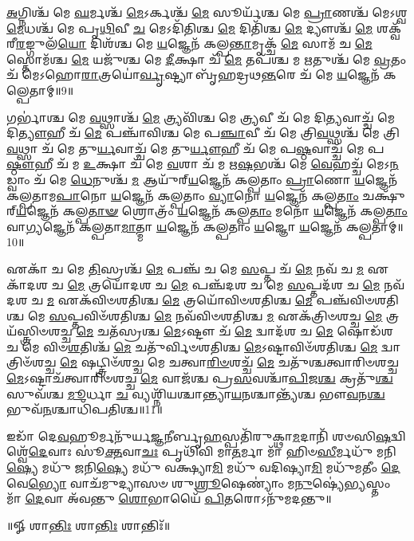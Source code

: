 \-\ul{𑌅}\-𑌗𑍍𑌨𑌿𑌶𑍍𑌚᳴ 𑌮𑍇 \ul{𑌘}\-𑌰𑍍𑌮𑌶𑍍𑌚᳴ \ul{𑌮𑍇}\-𑌽𑌰𑍍𑌕𑌶𑍍𑌚᳴ \ul{𑌮𑍇} 𑌸𑍂𑌰𑍍𑌯᳴𑌶𑍍𑌚 𑌮𑍇 \ul{𑌪𑍍𑌰𑌾}\-𑌣𑌶𑍍𑌚᳴ 𑌮𑍇𑌽𑌶𑍍𑌵\-\ul{𑌮𑍇}\-𑌧𑌶𑍍𑌚᳴ 𑌮𑍇 𑌪𑍃\-\ul{𑌥𑌿}\-𑌵𑍀 \ul{𑌚} 𑌮𑍇𑌽𑌦𑌿᳴𑌤𑌿𑌶𑍍𑌚 \ul{𑌮𑍇} 𑌦𑌿𑌤𑌿᳴𑌶𑍍𑌚 \ul{𑌮𑍇} 𑌦𑍍𑌯𑍗𑌶𑍍𑌚᳴ \ul{𑌮𑍇} 𑌶𑌕𑍍𑌵᳴𑌰𑍀\-\ul{𑌰}\-𑌙𑍍𑌗𑍁𑌲᳴\-\ul{𑌯𑍋} 𑌦𑌿𑌶᳴𑌶𑍍𑌚 𑌮𑍇 \ul{𑌯}\-𑌜𑍍𑌞𑍇𑌨᳴ 𑌕𑌲𑍍𑌪\-\ul{𑌨𑍍𑌤𑌾}\-𑌮𑍃𑌕𑍍𑌚᳴ \ul{𑌮𑍇} 𑌸𑌾𑌮᳴ 𑌚 \ul{𑌮𑍇} 𑌸𑍍𑌤𑍋𑌮᳴𑌶𑍍𑌚 \ul{𑌮𑍇} 𑌯𑌜𑍁᳴𑌶𑍍𑌚 𑌮𑍇 \ul{𑌦𑍀}\-𑌕𑍍𑌷𑌾 𑌚᳴ \ul{𑌮𑍇} 𑌤𑌪᳴𑌶𑍍𑌚 𑌮 \ul{𑌋}\-𑌤𑍁𑌶𑍍𑌚᳴ 𑌮𑍇 \ul{𑌵𑍍𑌰}\-𑌤𑌂 𑌚᳴ 𑌮𑍇𑌽𑌹𑍋\-\ul{𑌰𑌾}\-𑌤𑍍𑌰𑌯𑍋॑\-\ul{𑌰𑍍𑌵𑍃}\-𑌷𑍍𑌟𑍍𑌯𑌾 𑌬𑍃᳴𑌹𑌦𑍍𑌰𑌥\-\ul{𑌨𑍍𑌤}\-𑌰𑍇 𑌚᳴ 𑌮𑍇 \ul{𑌯}\-𑌜𑍍𑌞𑍇𑌨᳴ 𑌕𑌲𑍍𑌪𑍇𑌤𑌾𑌮𑍍॥9॥ 

𑌗𑌰𑍍𑌭𑌾॑𑌶𑍍𑌚 𑌮𑍇 \ul{𑌵}\-𑌥𑍍𑌸𑌾𑌶𑍍𑌚᳴ \ul{𑌮𑍇} 𑌤𑍍𑌰𑍍𑌯𑌵𑌿᳴𑌶𑍍𑌚 𑌮𑍇 \ul{𑌤𑍍𑌰𑍍𑌯}\-𑌵𑍀 𑌚᳴ 𑌮𑍇 𑌦𑌿\-\ul{𑌤𑍍𑌯}\-𑌵𑌾𑌚𑍍𑌚᳴ 𑌮𑍇 𑌦𑌿\-\ul{𑌤𑍍𑌯𑍗}\-𑌹𑍀 𑌚᳴ \ul{𑌮𑍇} 𑌪𑌞𑍍𑌚𑌾᳴𑌵𑌿𑌶𑍍𑌚 𑌮𑍇 𑌪\-\ul{𑌞𑍍𑌚𑌾}\-𑌵𑍀 𑌚᳴ 𑌮𑍇 𑌤𑍍𑌰𑌿\-\ul{𑌵}\-𑌥𑍍𑌸𑌶𑍍𑌚᳴ 𑌮𑍇 𑌤𑍍𑌰𑌿\-\ul{𑌵}\-𑌥𑍍𑌸𑌾 𑌚᳴ 𑌮𑍇 𑌤𑍁\-\ul{𑌰𑍍𑌯}\-𑌵𑌾𑌚𑍍𑌚᳴ 𑌮𑍇 𑌤𑍁\-\ul{𑌰𑍍𑌯𑍗}\-𑌹𑍀 𑌚᳴ 𑌮𑍇 𑌪\-\ul{𑌷𑍍𑌠}\-𑌵𑌾𑌚𑍍𑌚᳴ 𑌮𑍇 𑌪\-\ul{𑌷𑍍𑌠𑍗}\-𑌹𑍀 𑌚᳴ 𑌮 \ul{𑌉}\-𑌕𑍍𑌷𑌾 𑌚᳴ 𑌮𑍇 \ul{𑌵}\-𑌶𑌾 𑌚᳴ 𑌮 𑌋\-\ul{𑌷}\-𑌭𑌶𑍍𑌚᳴ 𑌮𑍇 \ul{𑌵𑍇}\-𑌹𑌚𑍍𑌚᳴ 𑌮𑍇𑌽\-\ul{𑌨}\-𑌡𑍍𑌵𑌾𑌂 𑌚᳴ 𑌮𑍇 \ul{𑌧𑍇}\-𑌨𑍁𑌶𑍍𑌚᳴ \ul{𑌮} 𑌆𑌯𑍁᳴𑌰𑍍‌\-\ul{𑌯}\-𑌜𑍍𑌞𑍇𑌨᳴ 𑌕𑌲𑍍𑌪𑌤𑌾𑌂 \ul{𑌪𑍍𑌰𑌾}\-𑌣𑍋 \ul{𑌯}\-𑌜𑍍𑌞𑍇𑌨᳴ 𑌕𑌲𑍍𑌪𑌤𑌾𑌮\-\ul{𑌪𑌾}\-𑌨𑍋 \ul{𑌯}\-𑌜𑍍𑌞𑍇𑌨᳴ 𑌕𑌲𑍍𑌪𑌤𑌾𑌂 \ul{𑌵𑍍𑌯𑌾}\-𑌨𑍋 \ul{𑌯}\-𑌜𑍍𑌞𑍇𑌨᳴ 𑌕𑌲𑍍𑌪\-\ul{𑌤𑌾𑌂} 𑌚𑌕𑍍𑌷𑍁᳴𑌰𑍍‌\-\ul{𑌯}\-𑌜𑍍𑌞𑍇𑌨᳴ 𑌕𑌲𑍍𑌪\-\ul{𑌤𑌾}\-\-\ul{𑍟} 𑌶𑍍𑌰𑍋𑌤𑍍𑌰𑌂᳴ \ul{𑌯}\-𑌜𑍍𑌞𑍇𑌨᳴ 𑌕𑌲𑍍𑌪\-\ul{𑌤𑌾𑌂} 𑌮𑌨𑍋᳴ \ul{𑌯}\-𑌜𑍍𑌞𑍇𑌨᳴ 𑌕𑌲𑍍𑌪\-\ul{𑌤𑌾𑌂} 𑌵𑌾\-\ul{𑌗𑍍𑌯}\-𑌜𑍍𑌞𑍇𑌨᳴ 𑌕𑌲𑍍𑌪𑌤𑌾\-\ul{𑌮𑌾}\-𑌤𑍍𑌮𑌾 \ul{𑌯}\-𑌜𑍍𑌞𑍇𑌨᳴ 𑌕𑌲𑍍𑌪𑌤𑌾𑌂 \ul{𑌯}\-𑌜𑍍𑌞𑍋 \ul{𑌯}\-𑌜𑍍𑌞𑍇𑌨᳴ 𑌕𑌲𑍍𑌪𑌤𑌾𑌮𑍍॥10॥ 

𑌏𑌕𑌾᳴ 𑌚 𑌮𑍇 \ul{𑌤𑌿}\-𑌸𑍍𑌰𑌶𑍍𑌚᳴ \ul{𑌮𑍇} 𑌪𑌞𑍍𑌚᳴ 𑌚 𑌮𑍇 \ul{𑌸}\-𑌪𑍍𑌤 𑌚᳴ \ul{𑌮𑍇} 𑌨𑌵᳴ 𑌚 \ul{𑌮} 𑌏𑌕𑌾᳴𑌦𑌶 𑌚 \ul{𑌮𑍇} 𑌤𑍍𑌰𑌯𑍋᳴𑌦𑌶 𑌚 \ul{𑌮𑍇} 𑌪𑌞𑍍𑌚᳴𑌦𑌶 𑌚 𑌮𑍇 \ul{𑌸}\-𑌪𑍍𑌤𑌦᳴𑌶 𑌚 \ul{𑌮𑍇} 𑌨𑌵᳴𑌦𑌶 𑌚 \ul{𑌮} 𑌏𑌕᳴𑌵𑌿𑍞𑌶𑌤𑌿𑌶𑍍𑌚 \ul{𑌮𑍇} 𑌤𑍍𑌰𑌯𑍋᳴𑌵𑌿𑍞𑌶𑌤𑌿𑌶𑍍𑌚 \ul{𑌮𑍇} 𑌪𑌞𑍍𑌚᳴𑌵𑌿𑍞𑌶𑌤𑌿𑌶𑍍𑌚 𑌮𑍇 \ul{𑌸}\-𑌪𑍍𑌤𑌵𑌿𑍞᳴𑌶𑌤𑌿𑌶𑍍𑌚 \ul{𑌮𑍇} 𑌨𑌵᳴𑌵𑌿𑍞𑌶𑌤𑌿𑌶𑍍𑌚 \ul{𑌮} 𑌏𑌕᳴𑌤𑍍𑌰𑌿𑍞𑌶𑌚𑍍𑌚 \ul{𑌮𑍇} 𑌤𑍍𑌰𑌯᳴𑌸𑍍𑌤𑍍𑌰𑌿𑍞𑌶𑌚𑍍𑌚 \ul{𑌮𑍇} 𑌚𑌤᳴𑌸𑍍𑌰𑌶𑍍𑌚 \ul{𑌮𑍇}\-𑌽𑌷𑍍𑌟𑍗 𑌚᳴ \ul{𑌮𑍇} 𑌦𑍍𑌵𑌾𑌦᳴𑌶 𑌚 \ul{𑌮𑍇} 𑌷𑍋𑌡᳴𑌶 𑌚 𑌮𑍇 𑌵𑌿𑍞\-\ul{𑌶}\-𑌤𑌿𑌶𑍍𑌚᳴ \ul{𑌮𑍇} 𑌚𑌤𑍁᳴𑌰𑍍𑌵𑌿𑍞𑌶𑌤𑌿𑌶𑍍𑌚 \ul{𑌮𑍇}\-𑌽𑌷𑍍𑌟𑌾𑌵𑌿𑍞᳴𑌶𑌤𑌿𑌶𑍍𑌚 \ul{𑌮𑍇} 𑌦𑍍𑌵𑌾𑌤𑍍𑌰𑌿𑍞᳴𑌶𑌚𑍍𑌚 \ul{𑌮𑍇} 𑌷𑌟𑍍𑌤𑍍𑌰𑌿𑍞᳴𑌶𑌚𑍍𑌚 𑌮𑍇 𑌚𑌤𑍍𑌵𑌾\-\ul{𑌰𑌿}\-\-\ul{𑍞}\-𑌶𑌚𑍍𑌚᳴ \ul{𑌮𑍇} 𑌚𑌤𑍁᳴𑌶𑍍𑌚𑌤𑍍𑌵𑌾𑌰𑌿𑍞𑌶𑌚𑍍𑌚 \ul{𑌮𑍇}\-𑌽𑌷𑍍𑌟𑌾𑌚᳴𑌤𑍍𑌵𑌾𑌰𑌿𑍞𑌶𑌚𑍍𑌚 \ul{𑌮𑍇} 𑌵𑌾𑌜᳴𑌶𑍍𑌚 𑌪𑍍𑌰\-\ul{𑌸}\-𑌵𑌶𑍍𑌚𑌾᳴\-\ul{𑌪𑌿}\-𑌜\-\ul{𑌶𑍍𑌚} 𑌕𑍍𑌰𑌤𑍁᳴\-\ul{𑌶𑍍𑌚} 𑌸𑍁𑌵᳴𑌶𑍍𑌚 \ul{𑌮𑍂}\-𑌰𑍍𑌧𑌾 \ul{𑌚} 𑌵𑍍𑌯𑌶𑍍𑌨𑌿᳴𑌯𑌶𑍍𑌚𑌾𑌨𑍍𑌤𑍍𑌯𑌾\-\ul{𑌯}\-𑌨𑌶𑍍𑌚𑌾𑌨𑍍𑌤𑍍𑌯᳴𑌶𑍍𑌚 𑌭𑍗\-\ul{𑌵}\-𑌨\-\ul{𑌶𑍍𑌚} 𑌭𑍁𑌵᳴\-\ul{𑌨}\-𑌶𑍍𑌚𑌾𑌧𑌿᳴𑌪𑌤𑌿𑌶𑍍𑌚॥11॥ 

𑌇𑌡𑌾᳴ 𑌦𑍇\-\ul{𑌵}\-𑌹𑍂𑌰𑍍𑌮𑌨𑍁᳴𑌰𑍍𑌯\-\ul{𑌜𑍍𑌞}\-𑌨𑍀𑌰𑍍𑌬𑍃\-\ul{𑌹}\-𑌸𑍍𑌪𑌤𑌿᳴𑌰𑍁𑌕𑍍𑌥𑌾\-\ul{𑌮}\-𑌦𑌾𑌨𑌿᳴ 𑌶𑍞𑌸𑌿\-\ul{𑌷}\-𑌦𑍍𑌵𑌿𑌶𑍍𑌵𑍇᳴\-\ul{𑌦𑍇}\-𑌵𑌾𑌃 𑌸𑍂॑\-\ul{𑌕𑍍𑌤}\-𑌵𑌾\-\ul{𑌚𑌃} 𑌪𑍃𑌥𑌿᳴𑌵𑌿 𑌮𑌾\-\ul{𑌤}\-𑌰𑍍𑌮𑌾 𑌮𑌾᳴ 𑌹𑌿𑍞\-\ul{𑌸𑍀}\-𑌰𑍍𑌮𑌧𑍁᳴ 𑌮𑌨𑌿\-\ul{𑌷𑍍𑌯𑍇} 𑌮𑌧𑍁᳴ 𑌜𑌨𑌿\-\ul{𑌷𑍍𑌯𑍇} 𑌮𑌧𑍁᳴ 𑌵𑌕𑍍𑌷𑍍𑌯𑌾\-\ul{𑌮𑌿} 𑌮𑌧𑍁᳴ 𑌵𑌦𑌿𑌷𑍍𑌯𑌾\-\ul{𑌮𑌿} 𑌮𑌧𑍁᳴𑌮𑌤𑍀𑌂 \ul{𑌦𑍇}\-𑌵𑍇\-\ul{𑌭𑍍𑌯𑍋} 𑌵𑌾𑌚᳴𑌮𑍁𑌦𑍍𑌯𑌾𑌸𑍞 𑌶𑍁\-\ul{𑌶𑍍𑌰𑍂}\-𑌷𑍇𑌣𑍍𑌯𑌾𑌂॑ 𑌮\-\ul{𑌨𑍁}\-𑌷𑍍𑌯𑍇॑\-\ul{𑌭𑍍𑌯}\-𑌸𑍍𑌤𑌂 𑌮𑌾᳴ \ul{𑌦𑍇}\-𑌵𑌾 𑌅᳴𑌵𑌨𑍍𑌤𑍁 \ul{𑌶𑍋}\-𑌭𑌾𑌯𑍈᳴ \ul{𑌪𑌿}\-𑌤𑌰𑍋𑌽𑌨𑍁᳴𑌮𑌦𑌨𑍍𑌤𑍁॥ 

\centerline{॥𑍐 𑌶𑌾\-\ul{𑌨𑍍𑌤𑌿𑌃} 𑌶𑌾\-\ul{𑌨𑍍𑌤𑌿𑌃} 𑌶𑌾𑌨𑍍𑌤𑌿𑌃᳴॥}


